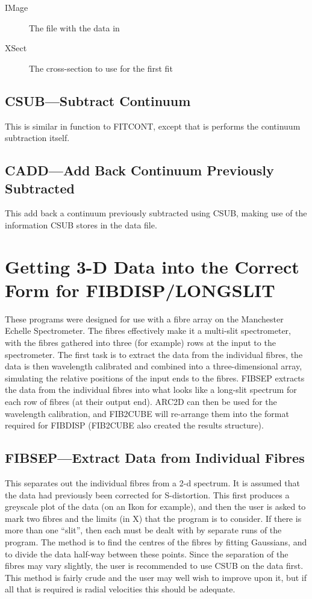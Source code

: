 \begin{description}
\item[IMage] The file with the data in
\item[XSect] The cross-section to use for the first fit
\end{description}


\subsection{CSUB---Subtract Continuum}

This is similar in function to FITCONT, except that is performs the
continuum subtraction itself.

\subsection{CADD---Add Back Continuum Previously Subtracted}

This add back a continuum previously subtracted using CSUB, making use
of the information CSUB stores in the data file.

\section{Getting 3-D Data into the Correct Form for FIBDISP/LONGSLIT}

These programs were designed for use with a fibre array on the
Manchester Echelle Spectrometer.
The fibres effectively make it a multi-slit spectrometer, with the
fibres gathered into three (for example) rows at the input to the
spectrometer.
The first task is to extract the data from the individual fibres, the
data is then wavelength calibrated and combined into a three-dimensional
array, simulating the relative positions of the input ends to the
fibres.
FIBSEP extracts the data from the individual fibres into what looks like a
long-slit spectrum for each row of fibres (at their output end).
ARC2D can then be used for the wavelength calibration, and FIB2CUBE will
re-arrange them into the format required for FIBDISP (FIB2CUBE also
created the results structure).

\subsection{FIBSEP---Extract Data from Individual Fibres}

This separates out the individual fibres from a 2-d spectrum. It is
assumed that the data had previously been corrected for S-distortion.
This first produces a greyscale plot of the data (on an Ikon for
example), and then the user is asked to mark two fibres and the limits
(in X) that the program is to consider.
If there is more than one ``slit'', then each must be dealt with by
separate runs of the program.
The method is to find the centres of the fibres by fitting Gaussians,
and to divide the data half-way between these points. Since the
separation of the fibres may vary slightly, the user is recommended
to use CSUB on the data first. This method is fairly crude and the user
may well wish to improve upon it, but if all that is required is radial
velocities this should be adequate.


